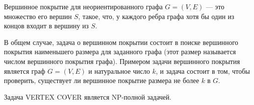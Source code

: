     \begin{Def}
        Вершинное покрытие для неориентированного графа $G=(V,E)$ --- это множество его вершин $S$, такое, что, у каждого ребра графа хотя бы один из концов входит в вершину из $S$.
    \end{Def}
    \begin{Def}
        В общем случае, задача о вершинном покрытии состоит в поиске вершинного покрытия наименьшего размера для заданного графа (этот размер называется числом вершинного покрытия графа). Примером задачи вершинного покрытия является граф $G=(V, E)$ и натуральное число $k$, и задача состоит в том, чтобы проверить, существует ли вершинное покрытие размера не более $k$ в $G$.
    \end{Def}
    \begin{Thm}
        Задача \textsc{VERTEX COVER} является \textsc{NP}-полной задачей.
    \end{Thm}
